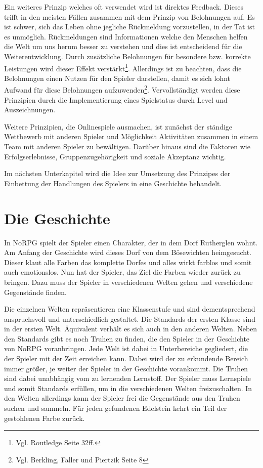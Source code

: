Ein weiteres Prinzip welches oft verwendet wird ist direktes Feedback. Dieses trifft in den meisten Fällen zusammen mit dem Prinzip von Belohnungen auf. Es ist schwer, sich das Leben ohne jegliche Rückmeldung vorzustellen, in der Tat ist es unmöglich. Rückmeldungen sind Informationen welche den Menschen helfen die Welt um uns herum besser zu verstehen und dies ist entscheidend für die Weiterentwicklung. Durch zusätzliche Belohnungen für besondere bzw. korrekte Leistungen wird dieser Effekt verstärkt\footnote{Vgl. Routledge \cite{seriousGamesPrinciples} Seite 32ff.}. Allerdings ist zu beachten, dass die Belohnungen einen Nutzen für den Spieler darstellen, damit es sich lohnt Aufwand für diese Belohnungen aufzuwenden\footnote{Vgl. Berkling, Faller und Piertzik \cite{gamesPaper} Seite 8}. Vervollständigt werden diese Prinzipien durch die Implementierung eines Spielstatus durch Level und Auszeichnungen.

Weitere Prinzipien, die Onlinespiele ausmachen, ist zunächst der ständige Wettbewerb mit anderen Spieler und Möglichkeit Aktivitäten zusammen in einem Team mit anderen Spieler zu bewältigen. Darüber hinaus sind die Faktoren wie Erfolgserlebnisse, Gruppenzugehörigkeit und soziale Akzeptanz wichtig. 

Im nächsten Unterkapitel wird die Idee zur Umsetzung des Prinzipes der Einbettung der Handlungen des Spielers in eine Geschichte behandelt.
	
\section{Die Geschichte}\label{geschichte}
In NoRPG spielt der Spieler einen Charakter, der in dem Dorf Rutherglen wohnt. Am Anfang der Geschichte wird dieses Dorf von dem Bösewichten heimgesucht. Dieser klaut alle Farben das komplette Dorfes und alles wirkt farblos und somit auch emotionslos. Nun hat der Spieler, das Ziel die Farben wieder zurück zu bringen. Dazu muss der Spieler in verschiedenen Welten gehen und verschiedene Gegenstände finden.

Die einzelnen Welten repräsentieren eine Klassenstufe und sind dementsprechend anspruchsvoll und unterschiedlich gestaltet. Die Standards der ersten Klasse sind in der ersten Welt. Äquivalent verhält es sich auch in den anderen Welten. Neben den Standards gibt es noch Truhen zu finden, die den Spieler in der Geschichte von NoRPG voranbringen. Jede Welt ist dabei in Unterbereiche gegliedert, die der Spieler mit der Zeit erreichen kann. Dabei wird der zu erkundende Bereich immer größer, je weiter der Spieler in der Geschichte vorankommt. Die Truhen sind dabei unabhängig vom zu lernenden Lernstoff. Der Spieler muss Lernspiele und somit Standards erfüllen, um in die verschiedenen Welten freizuschalten. In den Welten allerdings kann der Spieler frei die Gegenstände aus den Truhen suchen und sammeln. Für jeden gefundenen Edelstein kehrt ein Teil der gestohlenen Farbe zurück.

